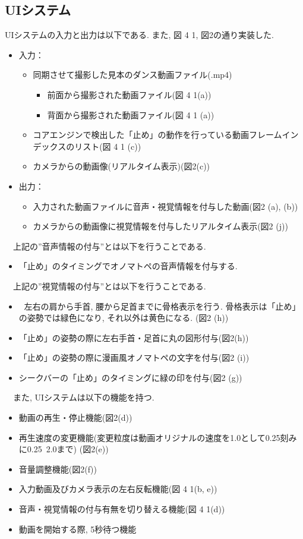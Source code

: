 \documentclass[paper]{ieicej}
\begin{document}
\subsection{UIシステム}
UIシステムの入力と出力は以下である. また, 図 4 1, 図2の通り実装した. 
\begin{itemize}[nosep]
  \item 入力：
  \begin{itemize}[nosep]
    \item 同期させて撮影した見本のダンス動画ファイル(.mp4)
    \begin{itemize}[nosep]
      \item 前面から撮影された動画ファイル(図 4 1(a))
      \item 背面から撮影された動画ファイル(図 4 1 (a))
    \end{itemize}
    \item コアエンジンで検出した「止め」の動作を行っている動画フレームインデックスのリスト(図 4 1 (c))
    \item カメラからの動画像(リアルタイム表示)(図2(c))
  \end{itemize}
  \item 出力：
  \begin{itemize}[nosep]
    \item 入力された動画ファイルに音声・視覚情報を付与した動画(図2 (a), (b))
    \item カメラからの動画像に視覚情報を付与したリアルタイム表示(図2 (j))
  \end{itemize}
\end{itemize}
　上記の”音声情報の付与”とは以下を行うことである.
\begin{itemize}[nosep]
  \item 「止め」のタイミングでオノマトペの音声情報を付与する. 
\end{itemize}
　上記の”視覚情報の付与”とは以下を行うことである. 
\begin{itemize}[nosep]
  \item 	左右の肩から手首, 腰から足首までに骨格表示を行う. 骨格表示は「止め」の姿勢では緑色になり, それ以外は黄色になる. (図2 (h))
  \item 「止め」の姿勢の際に左右手首・足首に丸の図形付与(図2(h))
  \item 「止め」の姿勢の際に漫画風オノマトペの文字を付与(図2 (i))
  \item シークバーの「止め」のタイミングに緑の印を付与(図2 (g))
\end{itemize}
　また, UIシステムは以下の機能を持つ. 
\begin{itemize}[nosep]
  \item 動画の再生・停止機能(図2(d))
  \item 再生速度の変更機能(変更粒度は動画オリジナルの速度を1.0として0.25刻みに0.25~2.0まで) (図2(e))
  \item 音量調整機能(図2(f))
  \item 入力動画及びカメラ表示の左右反転機能(図 4 1(b, e))
  \item 音声・視覚情報の付与有無を切り替える機能(図 4 1(d))
  \item 動画を開始する際, 5秒待つ機能
\end{itemize}
\end{document}
